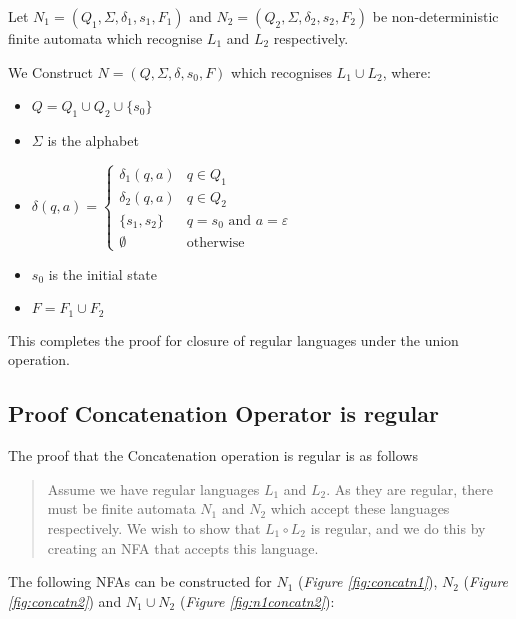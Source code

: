 \documentclass[11pt]{article}
\begin{document}
Let $N_1=(Q_1,\Sigma,\delta_1,s_1,F_1)$ and $N_2=(Q_2,\Sigma,\delta_2,s_2,F_2)$
be non-deterministic finite automata which recognise $L_1$ and $L_2$
respectively.

We Construct $N=(Q,\Sigma,\delta,s_0,F)$ which recognises $L_1 \cup L_2$, where:

\begin{itemize}
	\item[] $Q = Q_1 \cup Q_2 \cup \{s_0\}$
	\item[] $\Sigma$ is the alphabet
	\item[] $\delta(q,a) =
		      \begin{cases}
			      \delta_1 (q,a) & q\in Q_1                         \\
			      \delta_2 (q,a) & q \in Q_2                        \\
			      \{s_1, s_2\}   & q=s_0 \text{ and } a=\varepsilon \\
			      \emptyset      & \text{otherwise}
		      \end{cases}$
	\item[] $s_0$ is the initial state
	\item[] $F = F_1 \cup F_2$
\end{itemize}

This completes the proof for closure of regular languages under the union
operation.

\newpage
\subsection{Proof Concatenation Operator is regular}
The proof that the Concatenation operation is regular is as follows
\begin{quote}
	Assume we have regular languages $L_1$ and $L_2$. As they are regular, there
	must be finite automata $N_1$ and $N_2$ which accept these languages
	respectively. We wish to show that $L_1 \circ L_2$ is regular, and we do this
	by creating an NFA that accepts this language.
\end{quote}

The following NFAs can be constructed for $N_1$ (\emph{Figure \ref{fig:concatn1}}),
$N_2$ (\emph{Figure \ref{fig:concatn2}}) and $N_1 \cup N_2$ (\emph{Figure
	\ref{fig:n1concatn2}}):
\end{document}
